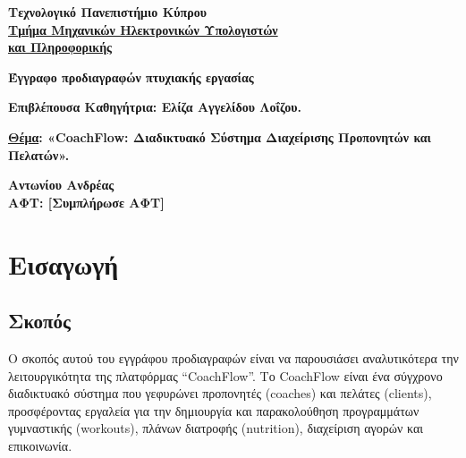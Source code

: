 \documentclass[12pt,a4paper]{report}
\begin{document}
\begin{titlepage}
    \centering
    \vspace*{1cm}
    
    \vspace{1cm}
    {\LARGE \textbf{Τεχνολογικό Πανεπιστήμιο Κύπρου}} \\
    \vspace{0.5cm}
    {\large \underline{\textbf{Τμήμα Μηχανικών Ηλεκτρονικών Υπολογιστών}}} \\
    {\large \underline{\textbf{και Πληροφορικής}}}
    
    \vspace{2cm}
    {\Large \textbf{Έγγραφο προδιαγραφών πτυχιακής εργασίας}}
    
    \vspace{2cm}
    {\large \textbf{Επιβλέπουσα Καθηγήτρια: Ελίζα Αγγελίδου Λοΐζου.}}
    
    \vspace{1cm}
    {\large \textbf{\underline{Θέμα}: «CoachFlow: Διαδικτυακό Σύστημα Διαχείρισης Προπονητών και Πελατών».}}
    
    \vfill
    \begin{flushright}
        \textbf{Αντωνίου Ανδρέας} \\
        \textbf{ΑΦΤ: [Συμπλήρωσε ΑΦΤ]}
    \end{flushright}
\end{titlepage}

\tableofcontents
\newpage

\section{Εισαγωγή}

\subsection{Σκοπός}
Ο σκοπός αυτού του εγγράφου προδιαγραφών είναι να παρουσιάσει αναλυτικότερα την λειτουργικότητα της πλατφόρμας “CoachFlow”. Το CoachFlow είναι ένα σύγχρονο διαδικτυακό σύστημα που γεφυρώνει προπονητές (coaches) και πελάτες (clients), προσφέροντας εργαλεία για την δημιουργία και παρακολούθηση προγραμμάτων γυμναστικής (workouts), πλάνων διατροφής (nutrition), διαχείριση αγορών και επικοινωνία.
\end{document}
